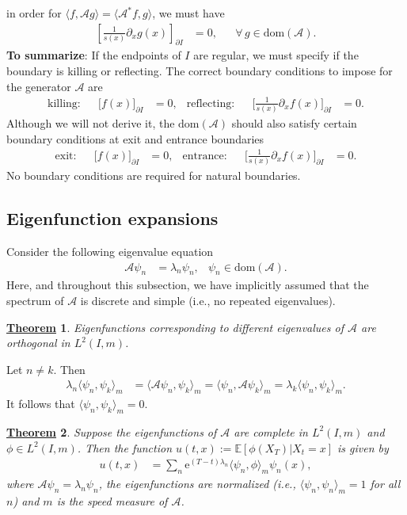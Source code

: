 \documentclass[12pt]{book}
\let\varphi\phi
\numberwithin{equation}{chapter}
\theoremstyle{plain}
\newtheorem{theorem}{\underline{Theorem}}
\numberwithin{theorem}{section}
\theoremstyle{definition}
\numberwithin{exercise}{chapter}
\let\oldendproof\endproof
\renewenvironment{proof}[1][\proofname]{%
  \oldproof[\scshape\underline{#1}]%
}{\oldendproof}
\newcommand{\<}{\langle}
\renewcommand{\>}{\rangle}
\renewcommand{\(}{\left(}
\renewcommand{\)}{\right)}
\renewcommand{\[}{\left[}
\renewcommand{\]}{\right]}
\newcommand\Eb{\mathds{E}}
\newcommand\Ac{\mathscr{A}}
\newcommand\lam{\lambda}
\renewcommand\d{\partial}
\newcommand\ee{\mathrm{e}}
\begin{document}
in order for $\<f, \Ac g\> = \< \Ac^* f , g \>$, we must have
\begin{align}
\[ \frac{1}{s(x)} \d_x g(x) \]_{\d I}
	&=	0 , &
&\forall \, g \in \text{dom}(\Ac) .
\end{align}
\textbf{To summarize}: If the endpoints of $I$ are regular, we must specify if the boundary is killing or reflecting.  The correct boundary conditions to impose for the generator $\Ac$ are
\begin{align}
\text{killing}:&&
\Big[ f(x) \Big]_{\d I}
	&=	0 , &
\text{reflecting}:&&
\Big[ \frac{1}{s(x)} \d_x f(x) \Big]_{\d I}
	&=	0 .
\end{align}
Although we will not derive it, the $\text{dom}(\Ac)$ should also satisfy certain boundary conditions at exit and entrance boundaries
\begin{align}
\text{exit}:&&
\Big[ f(x) \Big]_{\d I}
	&=	0 , &
\text{entrance}:&&
\Big[ \frac{1}{s(x)} \d_x f(x) \Big]_{\d I}
	&=	0 .
\end{align}
No boundary conditions are required for natural boundaries.

\subsection*{Eigenfunction expansions}
Consider the following eigenvalue equation
\begin{align}
\Ac \psi_n
	&=	\lam_n \psi_n , &
\psi_n
	\in \text{dom}(\Ac) .
\end{align}
Here, and throughout this subsection, we have implicitly assumed that the spectrum of $\Ac$ is discrete and simple (i.e., no repeated eigenvalues).

\begin{theorem}
Eigenfunctions corresponding to different eigenvalues of $\Ac$ are orthogonal in $L^2(I,m)$.
\end{theorem}

\begin{proof}
Let $n \neq k$.  Then
\begin{align}
\lam_n \< \psi_n , \psi_k \>_m
	&=	\< \Ac \psi_n , \psi_k \>_m
	=		\< \psi_n , \Ac \psi_k \>_m
	=		\lam_k \< \psi_n , \psi_k \>_m .
\end{align}
It follows that $\< \psi_n , \psi_k \>_m = 0$.
\end{proof}

\begin{theorem}
\label{thm:eigenfunction-kbe}
Suppose the eigenfunctions of $\Ac$ are complete in $L^2(I,m)$ and $\varphi \in L^2(I,m)$.  Then the function $u(t,x):= \Eb[ \varphi(X_T) | X_t = x]$ is given by 
\begin{align}
u(t,x)
	&=	\sum_n \ee^{(T-t)\lam_n} \< \psi_n, \varphi \>_m \psi_n(x) , \label{eq:u.eigen}
\end{align}
where $\Ac \psi_n = \lam_n \psi_n$, the eigenfunctions are normalized (i.e., $\<\psi_n,\psi_n\>_m = 1$ for all $n$) and $m$ is the speed measure of $\Ac$.
\end{theorem}
\end{document}
